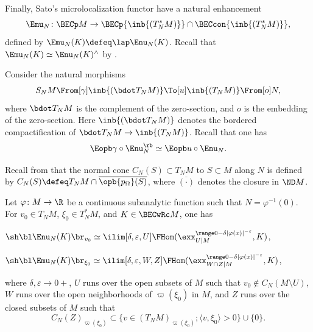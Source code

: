 Finally, Sato's microlocalization functor have a natural enhancement
\[
\Emu_N \colon \BECp M \to \BECp{\inb{(T^*_NM)}}\cap \BECcon{\inb{(T^*_NM)}},
\]
defined by $\Emu_N(K) \defeq \lap\Enu_N(K)$. Recall that $\Emu_N(K) \simeq \Enu_N(K)^\wedge$ by \cite[Prop.\,5.3]{DK19nu}.

Consider the natural morphisms
\[
S_NM \From[\gamma] \inb{(\bdot T_NM)} \To[u] \inb{(T_NM)} \From[o] N,
\]
where $\bdot T_NM$ is the complement of the zero-section, and $o$ is the embedding of the zero-section.
Here $\inb{(\bdot T_NM)}$ denotes the bordered compactification of $\bdot T_NM\to\inb{(T_NM)}$.
Recall that one has
\[
\Eopb\gamma \circ \Enu_N^\rb \simeq \Eopb u \circ \Enu_N.
\]

Recall from \cite[\S4.1]{KS90} that the normal cone $C_N(S)\subset T_NM$ to $S\subset M$ along $N$ is defined by $C_N(S) \defeq T_NM\cap\overline{\opb{p_\Omega}(S)}$,
where $\overline{(\cdot)}$ denotes the closure in $\ND M$.

\begin{proposition}\label{pro:numugerm}
Let $\varphi\colon M\to \R$ be a continuous subanalytic function such that
$N = \varphi^{-1}(0)$.
For $v_0\in T_NM$, $\xi_0\in T^*_NM$, and $K\in\BECwRc M$, one has
\begin{enumeratei}
\item
\label{pro:numugermi}
$\sh\bl\Enu_N(K)\br_{v_0} \simeq
\ilim[\delta,\varepsilon,U]
\FHom( \exx^{\range0{-\delta|\varphi(x)|^{-\varepsilon}}}_{U|M} , K)$,
\item
\label{pro:numugermii}
$\sh\bl\Emu_N(K)\br_{\xi_0} \simeq
\ilim[\delta,\varepsilon, W, Z]
\FHom(\exx^{\range0{-\delta|\varphi(x)|^{-\varepsilon}}}_{W\cap Z|M} , K)$,
\end{enumeratei}
\noindent
where $\delta,\varepsilon\to0+$, $U$ runs over the open subsets of $M$ such that $v_0\notin C_N(M\setminus U)$, $W$ runs over the open neighborhoods of $\varpi(\xi_0)$ in $M$, and
$Z$ runs over the closed subsets of $M$ such that
\[
C_N(Z)_{\varpi(\xi_0)}\subset\{v\in(T_NM)_{\varpi(\xi_0)}\semicolon \langle v,\xi_0\rangle>0\}\cup\{0\}.
\]
\end{proposition}

